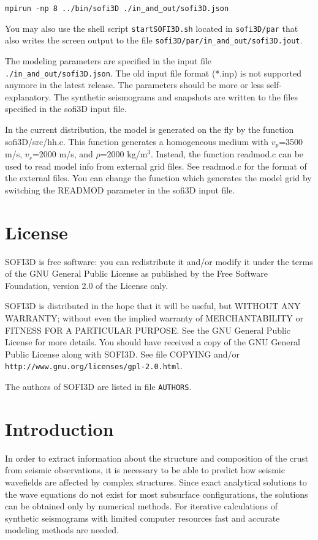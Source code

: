 \documentclass[11pt,onecolumn,oneside]{article}
\begin{document}
 \lstinline{mpirun -np 8 ../bin/sofi3D ./in_and_out/sofi3D.json}


You may also use the shell script  \lstinline{startSOFI3D.sh} located in  \lstinline{sofi3D/par} that also writes the screen output to the file  \lstinline{sofi3D/par/in_and_out/sofi3D.jout}.

The modeling parameters are specified in the input file \lstinline{./in_and_out/sofi3D.json}. The old input file format (*.inp) is not supported anymore in the latest release. The parameters should be more or less self-explanatory. The synthetic seismograms and snapshots are written to the files specified in the sofi3D input file.

In the current distribution, the model is generated on the fly by the function sofi3D/src/hh.c. This function generates a homogeneous medium with $v_p$=3500 m/s, $v_s$=2000 m/s, and $\rho$=2000 kg/$\mathrm{m}^3$. Instead, the function readmod.c can be used to read model info from external grid files. See readmod.c for the format of the external files. You can change the function which generates the model grid by switching the READMOD parameter in the sofi3D input file.

\section{License}\label{license}

SOFI3D is free software: you can redistribute it and/or modify it under the terms of the GNU General Public License as published by the Free Software Foundation, version 2.0 of the License only.
 
SOFI3D is distributed in the hope that it will be useful, but WITHOUT ANY WARRANTY; without even the implied warranty of MERCHANTABILITY or FITNESS FOR A PARTICULAR PURPOSE. See the GNU General Public License for more details. You should have received a copy of the GNU General Public License along with SOFI3D. See file COPYING and/or  \lstinline{http://www.gnu.org/licenses/gpl-2.0.html}.

The authors of SOFI3D are listed in file  \lstinline{AUTHORS}.

\section{Introduction}\label{intro}
In order to extract information about the structure and composition of the crust from seismic observations, it is necessary to be able to predict how seismic wavefields are affected by complex structures.
Since exact analytical solutions to the wave equations do not exist for most subsurface configurations, the solutions can be obtained only by numerical methods. For iterative calculations of synthetic seismograms with limited computer resources fast and accurate modeling methods are needed. 
\end{document}
